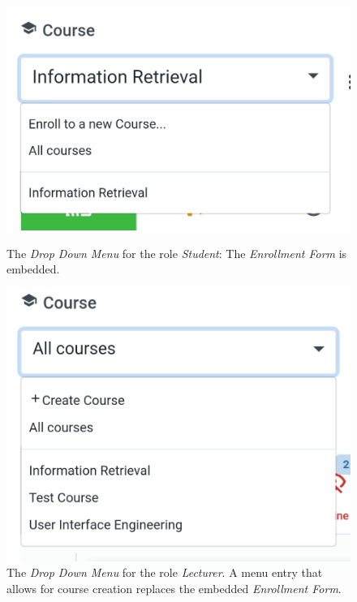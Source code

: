 \begin{figure}
	\centering
	\begin{minipage}[t]{.5\textwidth}
		\centering
		\includegraphics[width=0.95\linewidth]{screenshots/redesign/drop_down_student.jpg}
		\captionsetup{width=.8\linewidth}
		\captionsetup{format=plain}
		\caption{The \emph{Drop Down Menu} for the role \emph{Student}: The \emph{Enrollment Form} is embedded.}
		\label{fig:drop_down_student}
	\end{minipage}%
	\begin{minipage}[t]{.5\textwidth}
		\centering
		\includegraphics[width=0.95\linewidth]{screenshots/redesign/drop_down_lecturer.jpg}
		\captionsetup{width=.8\linewidth}
		\captionsetup{format=plain}
		\caption{The \emph{Drop Down Menu} for the role \emph{Lecturer}. A menu entry that allows for course creation replaces the embedded \emph{Enrollment Form}.}
		\label{fig:drop_down_lecturer}
	\end{minipage}
\end{figure}

